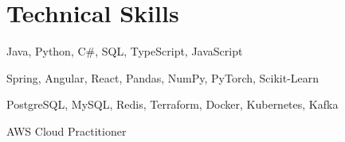 \documentclass[letterpaper,11pt]{article}
\begin{document}
\section{Technical Skills}
 \begin{description}[leftmargin=!,labelwidth=\widthof{\small\textit{Frameworks \& Libraries:XXX}}, itemsep=0.5pt, parsep=0.5pt]
    \item[\small{Languages:}] \small Java, Python,  C\#, SQL, TypeScript, JavaScript
    \item[\small{Frameworks \& Libraries:}] \small Spring, Angular, React, Pandas, NumPy, PyTorch, Scikit-Learn
    \item[\small{Tools:}] \small PostgreSQL, MySQL, Redis, Terraform, Docker, Kubernetes, Kafka
  \item[\small{Certifications:}] \small AWS Cloud Practitioner
\end{description}
\vspace{-10pt}

\end{document}
